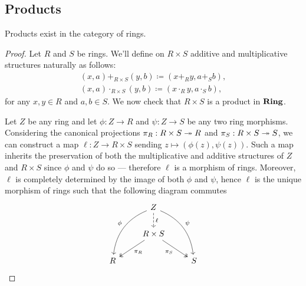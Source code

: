 \subsection{Products}

%
\begin{proposition}[Product]
\label{prop:product-ring}
Products exist in the category of rings.
\end{proposition}
%

%
\begin{proof}
Let \(R\) and \(S\) be rings. We'll define on \(R \times S\) additive and
multiplicative structures naturally as follows:
\begin{gather*}
(x, a) +_{R \times S} (y, b)     \coloneq (x +_R y, a +_S b), \\
(x, a) \cdot_{R \times S} (y, b) \coloneq (x \cdot_R y, a \cdot_S b),
\end{gather*}
for any \(x, y \in R\) and \(a, b \in S\). We now check that \(R \times S\) is a
product in \({\textbf{Ring}}\).

Let \(Z\) be any ring and let \(\phi: Z \to R\) and \(\psi: Z \to S\) be any two
ring morphisms. Considering the canonical projections \(\pi_R: R \times S \twoheadrightarrow
R\) and \(\pi_S: R \times S \twoheadrightarrow S\), we can construct a map \(\ell: Z \to R
\times S\) sending \(z \mapsto (\phi(z), \psi(z))\). Such a map inherits the
preservation of both the multiplicative and additive structures of \(Z\) and \(R
\times S\) since \(\phi\) and \(\psi\) do so --- therefore \(\ell\) is a
morphism of rings. Moreover, \(\ell\) is completely determined by the image of
both \(\phi\) and \(\psi\), hence \(\ell\) is the unique morphism of rings such
that the following diagram commutes
\[
\begin{tikzcd}
&Z \ar[ddl, bend right, swap, "\phi"]
\ar[ddr, bend left, "\psi"]
\ar[d, dashed, "\ell"] & \\
&R \times S \ar[ld, two heads, "\pi_R"]
\ar[rd, two heads, swap, "\pi_S"] &\\
R & &S
\end{tikzcd}
\]
\end{proof}
%

